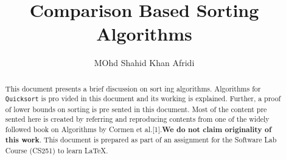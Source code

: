\documentclass[a4paper,10pt,twocolumn]{article}
\title{Comparison Based Sorting Algorithms}
\author{MOhd Shahid Khan Afridi}
\date{}
\begin{document}
\maketitle

\begin{abstract}
This document presents a brief discussion on sort
ing algorithms. Algorithms for \texttt{Quicksort} is pro
vided
in this document and its working is explained.
Further, a proof of lower bounds on sorting is pre
sented
in this document. Most of the content pre
sented
here is created by referring and reproducing
contents from one of the widely followed book on
Algorithms by Cormen et al.[1].\textbf{We do not claim
originality of this work}. This document is prepared
as part of an assignment for the Software Lab
Course (CS251) to learn
\LaTeX.

\end{abstract}
\end{document}
